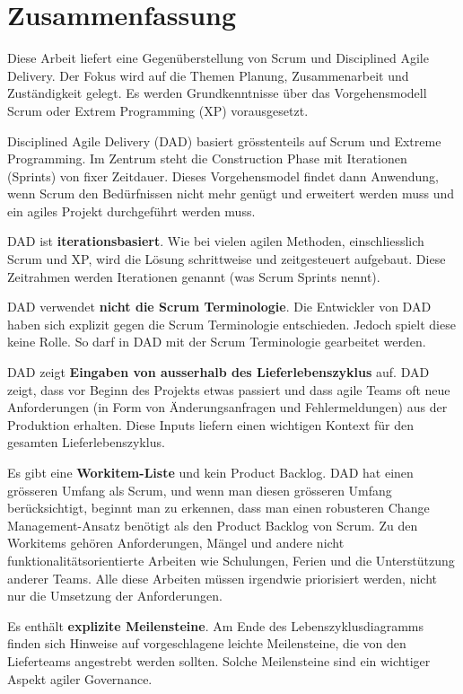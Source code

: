 \chapter*{Zusammenfassung}
\thispagestyle{fancy}

Diese Arbeit liefert eine Gegenüberstellung von Scrum und Disciplined Agile Delivery. Der Fokus wird auf die Themen Planung, Zusammenarbeit und Zuständigkeit gelegt. Es werden Grundkenntnisse über das Vorgehensmodell Scrum oder Extrem Programming (XP) vorausgesetzt.

Disciplined Agile Delivery (DAD) basiert grösstenteils auf Scrum und Extreme Programming. Im Zentrum steht die Construction Phase mit Iterationen (Sprints) von fixer Zeitdauer. Dieses Vorgehensmodel findet dann Anwendung, wenn Scrum den Bedürfnissen nicht mehr genügt und erweitert werden muss und ein agiles Projekt durchgeführt werden muss.

DAD ist \textbf{iterationsbasiert}. Wie bei vielen agilen Methoden, einschliesslich Scrum und XP, wird die Lösung schrittweise und zeitgesteuert aufgebaut. Diese Zeitrahmen werden Iterationen genannt (was Scrum Sprints nennt).

DAD verwendet \textbf{nicht die Scrum Terminologie}. Die Entwickler von DAD haben sich explizit gegen die Scrum Terminologie entschieden. Jedoch spielt diese keine Rolle. So darf in DAD mit der Scrum Terminologie gearbeitet werden.

DAD zeigt \textbf{Eingaben von ausserhalb des Lieferlebenszyklus} auf. DAD zeigt, dass vor Beginn des Projekts etwas passiert und dass agile Teams oft neue Anforderungen (in Form von Änderungsanfragen und Fehlermeldungen) aus der Produktion erhalten. Diese Inputs liefern einen wichtigen Kontext für den gesamten Lieferlebenszyklus.

Es gibt eine \textbf{Workitem-Liste} und kein Product Backlog. DAD hat einen grösseren Umfang als Scrum, und wenn man diesen grösseren Umfang berücksichtigt, beginnt man zu erkennen, dass man einen robusteren Change Management-Ansatz benötigt als den Product Backlog von Scrum. Zu den Workitems gehören Anforderungen, Mängel und andere nicht funktionalitätsorientierte Arbeiten wie Schulungen, Ferien und die Unterstützung anderer Teams. Alle diese Arbeiten müssen irgendwie priorisiert werden, nicht nur die Umsetzung der Anforderungen.

Es enthält \textbf{explizite Meilensteine}. Am Ende des Lebenszyklusdiagramms finden sich Hinweise auf vorgeschlagene leichte Meilensteine, die von den Lieferteams angestrebt werden sollten. Solche Meilensteine sind ein wichtiger Aspekt agiler Governance.

